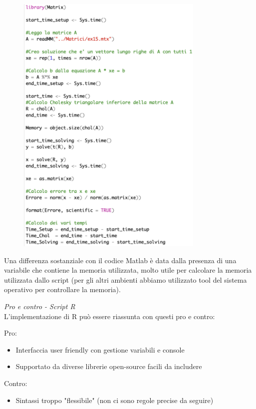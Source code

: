 \documentclass[preprint,12pt]{elsarticle}
\begin{document}
\begin{figure}[H]
	\includegraphics[width=0.80\textwidth]{rcode}
\end{figure}

Una differenza sostanziale con il codice Matlab è data dalla presenza di una variabile che contiene la memoria utilizzata, molto utile per calcolare la memoria utilizzata dallo script (per gli altri ambienti abbiamo utilizzato tool del sistema operativo per controllare la memoria).
\medskip


\textit{Pro e contro - Script R}\\
\vspace{4mm}
L'implementazione di R può essere riassunta con questi pro e contro:

Pro:
\begin{itemize}
	\item Interfaccia user friendly con gestione variabili e console
	\item Supportato da diverse librerie open-source facili da includere
\end{itemize}

Contro:
\begin{itemize}
	\item Sintassi troppo "flessibile" (non ci sono regole precise da seguire)
\end{itemize}
\end{document}
